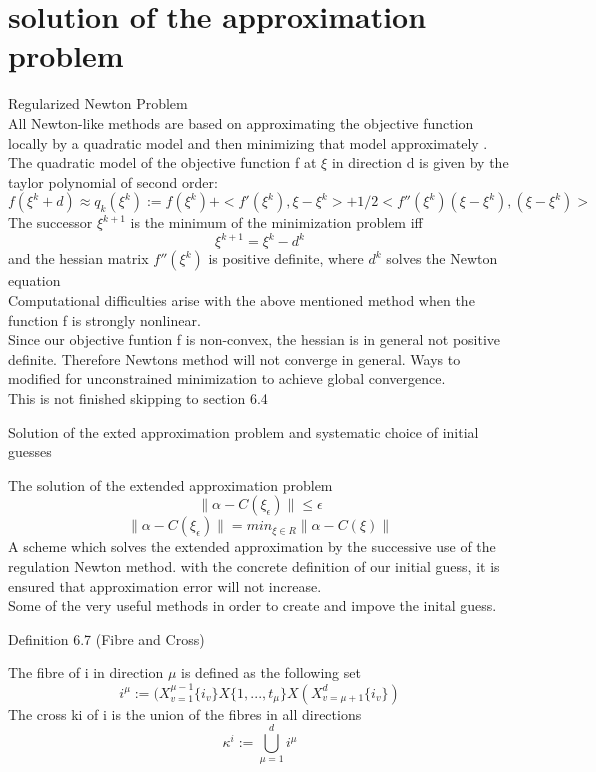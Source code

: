 \documentclass[10pt, draft]{article}
\begin{document}
   \section{solution of the approximation problem}
   
   Regularized Newton Problem\\
   
   All Newton-like methods are based on approximating the objective function locally by a quadratic model and then minimizing that model approximately .  The quadratic model of the objective function f at $\xi$ in direction d is given by the taylor polynomial of second order:
   \[f(\xi^k +d) \approx q_k(\xi^k) := f(\xi^k) + <f'(\xi^k),\xi-\xi^k> + 1/2<f''(\xi^k)(\xi-\xi^k),(\xi-\xi^k)>\]
   The successor $\xi^{k+1}$ is the minimum of the minimization problem iff 
   \[\xi^{k+1} = \xi^k-d^k\]
   and the hessian matrix $f''(\xi^k)$ is positive definite, where $d^k$ solves the Newton equation \\
   Computational difficulties arise with the above mentioned method when the function f is strongly nonlinear.  \\
   Since our objective funtion f is non-convex, the hessian is in general not positive definite. Therefore Newtons method will not converge in general.  Ways to modified for unconstrained minimization to achieve global convergence. \\
   This is not finished skipping to section 6.4\linebreak[1]
   
   Solution of the exted approximation problem and systematic choice of initial guesses\linebreak[1]
   
   The solution of the extended approximation problem
   \[ \|\alpha - C(\xi_\epsilon)\| \leq \epsilon\]
   \[\|\alpha - C(\xi_\epsilon)\| = min_{\xi \in R} \|\alpha - C(\xi)\| \]
   A scheme which solves the extended approximation by the successive use of the regulation Newton method.  with the concrete definition of our initial guess, it is ensured that approximation error will not increase.  \\
   Some of the very useful methods in order to create and impove the inital guess.\linebreak[1]
   
   Definition 6.7 (Fibre and Cross)\linebreak[1]
   
   The fibre of i in direction $\mu$ is defined as the following set 
   \[ i^\mu := ( X_{v=1}^{\mu-1} \{i_v\} X \{1,...,t_\mu\} X (  X_{v=\mu+1}^d \{i_v\})\]
   The cross ki of i is the union of the fibres in all directions
   \[ \kappa^i := \bigcup_{\mu=1}^d i^\mu \]
   
\end{document}
